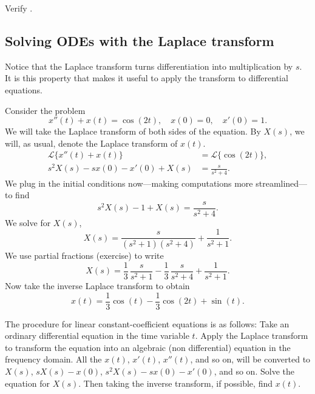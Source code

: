 \begin{exercise}
Verify .
\end{exercise}

\subsection{Solving ODEs with the Laplace transform}

Notice that the Laplace transform turns differentiation into
multiplication by $s$.
It is this property that makes it useful to apply 
the transform to differential equations.

\begin{example}
Consider the problem
\begin{equation*}
x''(t) + x(t) = \cos (2t), \quad x(0) = 0, \quad x'(0) = 1 .
\end{equation*}
We will take the Laplace transform of both sides of the equation.
By $X(s)$, we will, as usual, denote the Laplace transform of
$x(t)$.
\begin{align*}
\mathcal{L} \bigl\{ x''(t) + x(t) \bigr\} & = \mathcal{L} \bigl\{ \cos (2t) \bigr\} , \\
s^2 X(s) -sx(0)-x'(0) + X(s) & = \frac{s}{s^2 + 4} .
\end{align*}
We plug in the initial conditions now---making computations more
streamlined---to find
\begin{equation*}
s^2 X(s) -1 + X(s) = \frac{s}{s^2 + 4} .
\end{equation*}
We solve for $X(s)$,
\begin{equation*}
X(s) = \frac{s}{(s^2+1)(s^2 + 4)} + \frac{1}{s^2+1} .
\end{equation*}
We use partial fractions (exercise) to write
\begin{equation*}
X(s) =\frac{1}{3} \, \frac{s}{s^2+1} - 
\frac{1}{3}\, \frac{s}{s^2+4} + \frac{1}{s^2+1} .
\end{equation*}
Now take the inverse Laplace transform to obtain
\begin{equation*}
x(t) =\frac{1}{3}  \cos (t) -
\frac{1}{3} \cos (2t) + \sin (t) .
\end{equation*}
\end{example}

The procedure for linear constant-coefficient equations is as follows:
Take an ordinary differential
equation in the time variable $t$.  Apply the Laplace transform
to transform the equation into an algebraic (non differential) equation in
the frequency domain.  All the $x(t)$, $x'(t)$, $x''(t)$, and so on, will
be converted to $X(s)$, $sX(s) - x(0)$, $s^2X(s) - sx(0) - x'(0)$,
and so on.
Solve the equation for $X(s)$.
Then taking the inverse transform, if possible, find $x(t)$.

